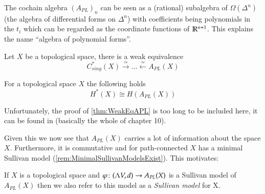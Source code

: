  The cochain algebra ${(A_{PL})}_n$ can be seen as a (rational) subalgebra of 
 $\Omega(\Delta^n)$ (the algebra of differential forms on  $\Delta^n$) with coefficients being polynomials in
 the $t_i$ which can be regarded as the coordinate functions of $\mathbb{R}^{n+1}$. This explains the name 
 ``algebra of polynomial forms''.
 
 \begin{Theorem}
 \label{thm:WeakEqAPL}
  Let $X$ be a topological space, there is a weak equivalence 
  $${C^*_{sing}(X) \overset{\simeq}{\longrightarrow} \ldots \overset{\simeq}{\longleftarrow} A_{PL}(X)}$$
 \end{Theorem}
 
 \begin{Corollary}
  For a topological space $X$ the following holds
  $$ H^*(X) \cong H(A_{PL}(X)) $$
 \end{Corollary}

 Unfortunately, the proof of \ref{thm:WeakEqAPL} is too long to be included here, it can be found
 in \cite{Felix2001} (basically the whole of chapter 10).

 Given this we now see that $A_{PL}(X)$ carries a lot of information about the space $X$. Furthermore, it is
 commutative and for path-connected $X$ has a minimal Sullivan model (\ref{rem:MinimalSullivanModelsExist}). This
 motivates:
 
 \begin{Definition}
  If $X$ is a topological space and $\varphi \colon (\Lambda V,d) \to A_{PL}(X)$ is a Sullivan model of $A_{PL}(X)$ 
  then we also refer to this model as a \emph{Sullivan model} for X.
 \end{Definition}

